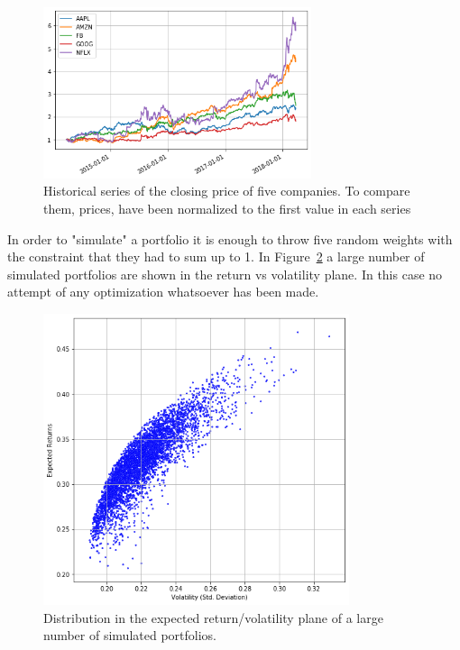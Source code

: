 \begin{figure}[htb]
\centering
\includegraphics[width=0.7\textwidth]{figures/portfolio_sample}
\caption{Historical series of the closing price of five companies. To compare them, prices, have been normalized to the 
first value in each series}
\label{fig:stocks}
\end{figure}
    
In order to "simulate" a portfolio it is enough to throw five random weights with the constraint that they had to sum up to 1. 
In Figure~\ref{fig:mc_portfolio} a large number of simulated portfolios are shown in the return vs volatility plane. 
In this case no attempt of any optimization whatsoever has been made.

\begin{figure}[hbt]
\centering
\includegraphics[width=0.8\textwidth]{figures/return_variance}
\caption{Distribution in the expected return/volatility plane of a large number of simulated portfolios.}
\label{fig:mc_portfolio}
\end{figure}

